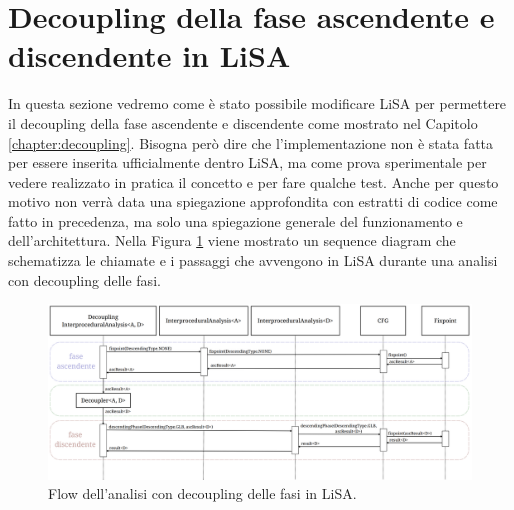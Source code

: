 \section{Decoupling della fase ascendente e discendente in LiSA}\label{sec:lisaDecoupling}
In questa sezione vedremo come è stato possibile modificare LiSA per permettere il decoupling della fase ascendente e discendente come mostrato nel Capitolo \ref{chapter:decoupling}. Bisogna però dire che l'implementazione non è stata fatta per essere inserita ufficialmente dentro LiSA, ma come prova sperimentale per vedere realizzato in pratica il concetto e per fare qualche test. Anche per questo motivo non verrà data una spiegazione approfondita con estratti di codice come fatto in precedenza, ma solo una spiegazione generale del funzionamento e dell'architettura. Nella Figura \ref{fig:flowDecoupling} viene mostrato un sequence diagram che schematizza le chiamate e i passaggi che avvengono in LiSA durante una analisi con decoupling delle fasi. 
\begin{figure}[ht]
	\centering
	\includegraphics[width=\textwidth]{Immagini/decouplingFlow.png}
	\caption{Flow dell'analisi con decoupling delle fasi in LiSA.}
	\label{fig:flowDecoupling}
\end{figure}

